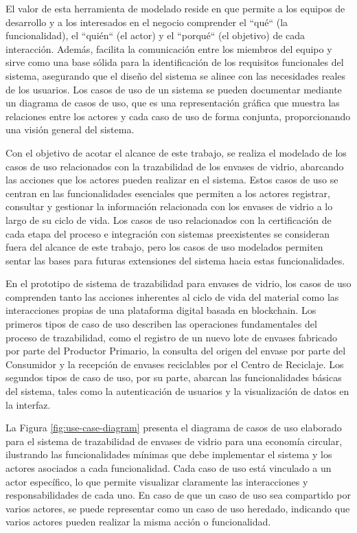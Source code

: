 El valor de esta herramienta de modelado reside en que permite a los equipos de desarrollo y a los interesados en el negocio comprender el ``qué`` (la funcionalidad), el ``quién`` (el actor) y el ``porqué`` (el objetivo) de cada interacción. Además, facilita la comunicación entre los miembros del equipo y sirve como una base sólida para la identificación de los requisitos funcionales del sistema, asegurando que el diseño del sistema se alinee con las necesidades reales de los usuarios. Los casos de uso de un sistema se pueden documentar mediante un diagrama de casos de uso, que es una representación gráfica que muestra las relaciones entre los actores y cada caso de uso de forma conjunta, proporcionando una visión general del sistema.

Con el objetivo de acotar el alcance de este trabajo, se realiza el modelado de los casos de uso relacionados con la trazabilidad de los envases de vidrio, abarcando las acciones que los actores pueden realizar en el sistema. Estos casos de uso se centran en las funcionalidades esenciales que permiten a los actores registrar, consultar y gestionar la información relacionada con los envases de vidrio a lo largo de su ciclo de vida. Los casos de uso relacionados con la certificación de cada etapa del proceso e integración con sistemas preexistentes se consideran fuera del alcance de este trabajo, pero los casos de uso modelados permiten sentar las bases para futuras extensiones del sistema hacia estas funcionalidades.

En el prototipo de sistema de trazabilidad para envases de vidrio, los casos de uso comprenden tanto las acciones inherentes al ciclo de vida del material como las interacciones propias de una plataforma digital basada en blockchain. Los primeros tipos de caso de uso describen las operaciones fundamentales del proceso de trazabilidad, como el registro de un nuevo lote de envases fabricado por parte del Productor Primario, la consulta del origen del envase por parte del Consumidor y la recepción de envases reciclables por el Centro de Reciclaje. Los segundos tipos de caso de uso, por su parte, abarcan las funcionalidades básicas del sistema, tales como la autenticación de usuarios y la visualización de datos en la interfaz.

La Figura \ref{fig:use-case-diagram} presenta el diagrama de casos de uso elaborado para el sistema de trazabilidad de envases de vidrio para una economía circular, ilustrando las funcionalidades mínimas que debe implementar el sistema y los actores asociados a cada funcionalidad. Cada caso de uso está vinculado a un actor específico, lo que permite visualizar claramente las interacciones y responsabilidades de cada uno. En caso de que un caso de uso sea compartido por varios actores, se puede representar como un caso de uso heredado, indicando que varios actores pueden realizar la misma acción o funcionalidad.

